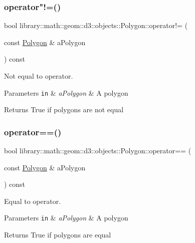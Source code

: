 \subsubsection{\texorpdfstring{operator"!=()}{operator!=()}}
{\footnotesize\ttfamily bool library\+::math\+::geom\+::d3\+::objects\+::\+Polygon\+::operator!= (\begin{DoxyParamCaption}\item[{const \hyperlink{classlibrary_1_1math_1_1geom_1_1d3_1_1objects_1_1_polygon}{Polygon} \&}]{a\+Polygon }\end{DoxyParamCaption}) const}



Not equal to operator. 


\begin{DoxyParams}[1]{Parameters}
\mbox{\tt in}  & {\em a\+Polygon} & A polygon \\
\hline
\end{DoxyParams}
\begin{DoxyReturn}{Returns}
True if polygons are not equal 
\end{DoxyReturn}
\mbox{\label{classlibrary_1_1math_1_1geom_1_1d3_1_1objects_1_1_polygon_ac8aa92cf9ed3cbcd063df07ce3a89f60}} 
\subsubsection{\texorpdfstring{operator==()}{operator==()}}
{\footnotesize\ttfamily bool library\+::math\+::geom\+::d3\+::objects\+::\+Polygon\+::operator== (\begin{DoxyParamCaption}\item[{const \hyperlink{classlibrary_1_1math_1_1geom_1_1d3_1_1objects_1_1_polygon}{Polygon} \&}]{a\+Polygon }\end{DoxyParamCaption}) const}



Equal to operator. 


\begin{DoxyParams}[1]{Parameters}
\mbox{\tt in}  & {\em a\+Polygon} & A polygon \\
\hline
\end{DoxyParams}
\begin{DoxyReturn}{Returns}
True if polygons are equal 
\end{DoxyReturn}
\mbox{\label{classlibrary_1_1math_1_1geom_1_1d3_1_1objects_1_1_polygon_a6d30846a912386e5e814e0bffa0a4042}} 
